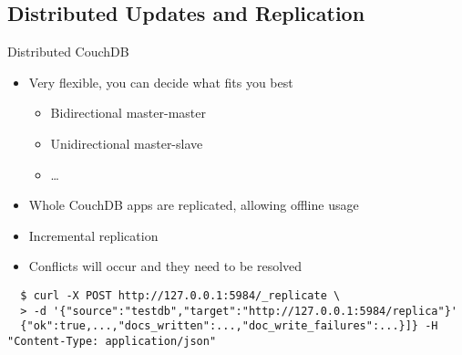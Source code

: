 \documentclass{beamer}
\begin{document}
\subsection{Distributed Updates and Replication}
\begin{frame}[fragile]{Distributed CouchDB}
  \begin{itemize}
    \item Very flexible, you can decide what fits you best
    \begin{itemize}
      \item Bidirectional master-master
      \item Unidirectional master-slave
      \item \ldots
    \end{itemize}
    \item Whole CouchDB apps are replicated, allowing offline usage
    \item Incremental replication
    \item Conflicts will occur and they need to be resolved
  \end{itemize}
  \fontsize{6}{8}\selectfont
  \begin{verbatim}
  $ curl -X POST http://127.0.0.1:5984/_replicate \
  > -d '{"source":"testdb","target":"http://127.0.0.1:5984/replica"}'
  {"ok":true,...,"docs_written":...,"doc_write_failures":...}]} -H "Content-Type: application/json"
  \end{verbatim}
\end{frame}
\end{document}
